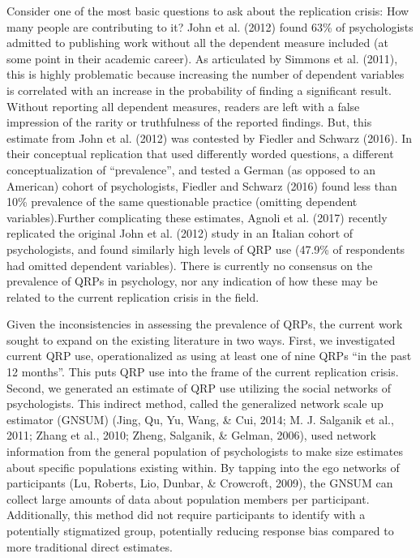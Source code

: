 \documentclass[,jou]{apa6}
\theoremstyle{definition}
\theoremstyle{definition}
\theoremstyle{definition}
\theoremstyle{remark}
\begin{document}
Consider one of the most basic questions to ask about the replication
crisis: How many people are contributing to it? John et al. (2012) found
63\% of psychologists admitted to publishing work without all the
dependent measure included (at some point in their academic career). As
articulated by Simmons et al. (2011), this is highly problematic because
increasing the number of dependent variables is correlated with an
increase in the probability of finding a significant result. Without
reporting all dependent measures, readers are left with a false
impression of the rarity or truthfulness of the reported findings. But,
this estimate from John et al. (2012) was contested by Fiedler and
Schwarz (2016). In their conceptual replication that used differently
worded questions, a different conceptualization of \enquote{prevalence},
and tested a German (as opposed to an American) cohort of psychologists,
Fiedler and Schwarz (2016) found less than 10\% prevalence of the same
questionable practice (omitting dependent variables).Further
complicating these estimates, Agnoli et al. (2017) recently replicated
the original John et al. (2012) study in an Italian cohort of
psychologists, and found similarly high levels of QRP use (47.9\% of
respondents had omitted dependent variables). There is currently no
consensus on the prevalence of QRPs in psychology, nor any indication of
how these may be related to the current replication crisis in the field.

Given the inconsistencies in assessing the prevalence of QRPs, the
current work sought to expand on the existing literature in two ways.
First, we investigated current QRP use, operationalized as using at
least one of nine QRPs \enquote{in the past 12 months}. This puts QRP
use into the frame of the current replication crisis. Second, we
generated an estimate of QRP use utilizing the social networks of
psychologists. This indirect method, called the generalized network
scale up estimator (GNSUM) (Jing, Qu, Yu, Wang, \& Cui, 2014; M. J.
Salganik et al., 2011; Zhang et al., 2010; Zheng, Salganik, \& Gelman,
2006), used network information from the general population of
psychologists to make size estimates about specific populations existing
within. By tapping into the ego networks of participants (Lu, Roberts,
Lio, Dunbar, \& Crowcroft, 2009), the GNSUM can collect large amounts of
data about population members per participant. Additionally, this method
did not require participants to identify with a potentially stigmatized
group, potentially reducing response bias compared to more traditional
direct estimates.
\end{document}
